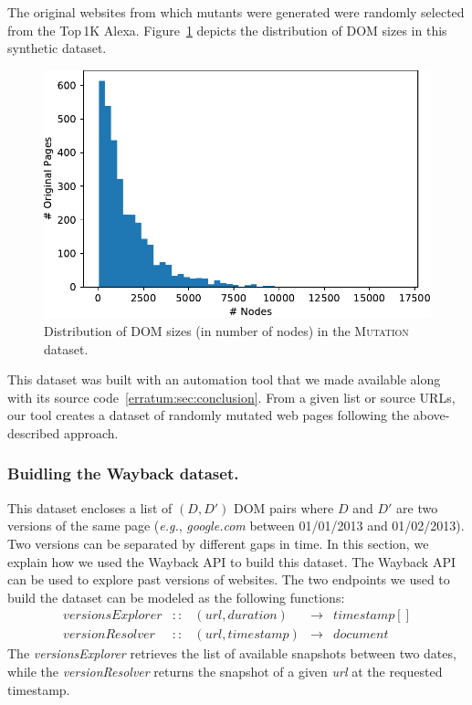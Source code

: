 The original websites from which mutants were generated were randomly selected from the Top\,1K Alexa.
Figure~\ref{fig:distribution} depicts the distribution of DOM sizes in this synthetic dataset. 

\begin{figure}[h]
  \centering
  \includegraphics[width=.8\linewidth]{erratum/distribution}
  \caption{Distribution of DOM sizes (in number of nodes) in the \textsc{Mutation} dataset.}
  \label{fig:distribution}
\end{figure}

This dataset was built with an automation tool that we made available along with its source code~\ref{erratum:sec:conclusion}.
From a given list or source URLs, our tool creates a dataset of randomly mutated web pages following the above-described approach.

\subsubsection{Buidling the {\sc Wayback} dataset.}\label{waybackDataset}
This dataset encloses a list of $(D, D')$ DOM pairs where $D$ and $D'$ are two versions of the same page (\emph{e.g.}, \textit{google.com} between 01/01/2013 and 01/02/2013).
Two versions can be separated by different gaps in time.
In this section, we explain how we used the Wayback API to build this dataset.
The Wayback API can be used to explore past versions of websites.
The two endpoints we used to build the dataset can be modeled as the following functions:
\begin{align*}
versionsExplorer &::& (url, duration)  & \to & timestamp[] \\
versionResolver  &::& (url, timestamp) & \to & document
\end{align*}
The \textit{versionsExplorer} retrieves the list of available snapshots between two dates, while the \textit{versionResolver} returns the snapshot of a given \textit{url} at the requested timestamp.

